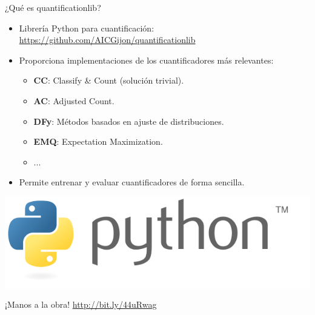 \documentclass{beamer}
\begin{document}
\begin{frame}{¿Qué es quantificationlib?}
\begin{itemize}
    \item Librería Python para cuantificación: \url{https://github.com/AICGijon/quantificationlib}
    \item Proporciona implementaciones de los cuantificadores más relevantes:
    \begin{itemize}
        \item \textbf{CC}: Classify \& Count (solución trivial).
        \item \textbf{AC}: Adjusted Count.
        \item \textbf{DFy}: Métodos basados en ajuste de distribuciones.
        \item \textbf{EMQ}: Expectation Maximization.
        \item ...
    \end{itemize}
    \item Permite entrenar y evaluar cuantificadores de forma sencilla.
\end{itemize}
\centering
\vspace{0.5cm}
\includegraphics[width=0.6\linewidth]{images/python.png}
\end{frame}

\begin{frame}{¡Manos a la obra!}
\centering
\huge
\url{http://bit.ly/44uRwag}
\end{frame}
\end{document}
